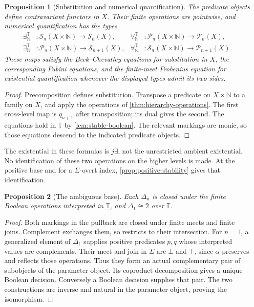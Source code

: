 \documentclass[11pt,a4paper]{article}
\numberwithin{equation}{section}
\newtheorem{proposition}[proposition]{Proposition}
\theoremstyle{definition}
\theoremstyle{remark}
\theoremstyle{plain}
\newcommand{\N}{\mathbb N}
\newcommand{\TV}{\mathbb T}
\newcommand{\SSn}{\mathcal S}
\newcommand{\PPn}{\mathcal P}
\begin{document}
\begin{proposition}[Substitution and numerical quantification]
\label{prop:quantifier-calculus}
The predicate objects define contravariant functors in $X$. Their
finite operations are pointwise, and numerical quantification has the
types
\begin{align}
 \exists^{\TV}_{\N}&:\SSn_n(X\times\N)\to\SSn_n(X),&
 \forall^{\TV}_{\N}&:\PPn_n(X\times\N)\to\PPn_n(X),
 \label{eq:same-level-quantifiers}\\
 \exists^{\TV}_{\N}&:\PPn_n(X\times\N)\to\SSn_{n+1}(X),&
 \forall^{\TV}_{\N}&:\SSn_n(X\times\N)\to\PPn_{n+1}(X).
 \label{eq:cross-level-quantifiers}
\end{align}
These maps satisfy the Beck--Chevalley equations for substitution in
$X$, the corresponding Fubini equations, and the finite-meet Frobenius
equation for existential quantification whenever the displayed types
admit its two sides.
\end{proposition}
\begin{proof}
Precomposition defines substitution. Transpose a predicate on
$X\times\N$ to a family on $X$, and apply the operations of
\cref{thm:hierarchy-operations}. The first cross-level map is
$q_{n+1}$ after transposition; its dual gives the second.
The equations hold in $\TV$ by \cref{lem:stable-boolean}.
The relevant markings are monic, so those equations descend to the
indicated predicate objects.
\end{proof}

The existential in these formulas is $j\exists$, not the unrestricted
ambient existential. No identification of these two operations on the
higher levels is made. At the positive base and for a $\Sigma$-overt
index, \cref{prop:positive-stability} gives that identification.

\begin{proposition}[The ambiguous base]
\label{prop:ambiguous-base}
Each $\Delta_n$ is closed under the finite Boolean operations interpreted
in $\TV$, and $\Delta_1\cong2$ over $\TV$.
\end{proposition}
\begin{proof}
Both markings in the pullback are closed under finite meets and finite
joins. Complement exchanges them, so restricts to their intersection.
For $n=1$, a generalized element of $\Delta_1$ supplies positive
predicates $p,q$ whose interpreted values are complements. Their meet
and join in $\Sigma$ are $\bot$ and $\top$, since $\alpha$ preserves
and reflects those operations. Thus they form an actual complementary
pair of subobjects of the parameter object. Its coproduct decomposition
gives a unique Boolean decision. Conversely a Boolean decision supplies
that pair. The two constructions are inverse and natural in the
parameter object, proving the isomorphism.
\end{proof}
\end{document}
